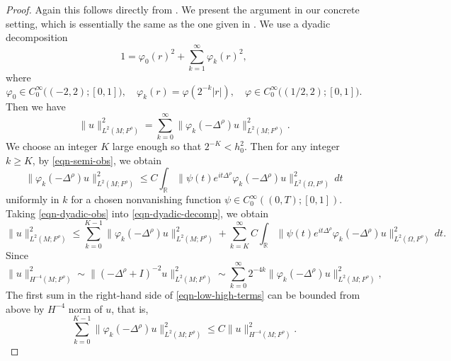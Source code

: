 \documentclass[11pt,oneside,reqno]{amsart}
\newcommand\R{\ensuremath{\mathbb{R}}}
\theoremstyle{definition}
\numberwithin{equation}{section}
\theoremstyle{plain}
\begin{document}
\begin{proof}
    Again this follows directly from  \cite[Theorem 7]{burq2004}. We present the argument in our concrete setting, which is essentially the same as the one given in \cite[Proposition 2.2]{jin2018control}. We use a dyadic decomposition  
    \begin{equation*}
        1=\varphi_0(r)^2+\sum_{k=1}^\infty \varphi_k(r)^2,
    \end{equation*}
    where 
    \begin{equation*}
        \varphi_0 \in C_0^\infty \bigl( (-2,2); [0,1] \bigr),\quad \varphi_k(r)=\varphi(2^{-k}|r|),\quad \varphi \in C_0^\infty \bigl((1/2,2);[0,1]\bigr).
    \end{equation*}
    Then we have
    \begin{equation}
        \|u\|^2_{L^2(M;F^\rho)}=\sum_{k=0}^\infty \|\varphi_k(-\Delta^\rho) u\|^2_{L^2(M;F^\rho)}.\label{eqn-dyadic-decomp}
    \end{equation}
    We choose an integer $K$ large enough so that $2^{-K}<h_0^2$. Then for any integer $k\ge K$, by \eqref{eqn-semi-obs}, we obtain
    \begin{equation}
        \|\varphi_k(-\Delta^\rho) u\|^2_{L^2(M;F^\rho)}\le C \int_\R \|\psi(t) e^{it\Delta^\rho}\varphi_k(-\Delta^\rho )u\|^2_{L^2(\Omega,F^\rho)}\,d t\label{eqn-dyadic-obs}
    \end{equation}
    uniformly in $k$ for a chosen nonvanishing function $\psi\in C_0^\infty ((0,T);[0,1])$. Taking \eqref{eqn-dyadic-obs} into \eqref{eqn-dyadic-decomp}, we obtain
    \begin{equation}
        \|u\|^2_{L^2(M;F^\rho)}\le \sum_{k=0}^{K-1} \|\varphi_k(-\Delta^\rho)u\|^2_{L^2(M;F^\rho)}+\sum_{k=K}^\infty C \int_\R \|\psi(t) e^{it\Delta^\rho}\varphi_k(-\Delta^\rho )u\|^2_{L^2(\Omega,F^\rho)}\,d t.\label{eqn-low-high-terms}
    \end{equation}
    Since
    \begin{equation*}
        \|u\|^2_{H^{-4}(M;F^\rho)}\sim \|(-\Delta^\rho+I)^{-2}u\|^2_{L^2(M;F^\rho)}\sim \sum_{k=0}^\infty 2^{-4k}\|\varphi_k(-\Delta^\rho) u\|^2_{L^2(M;F^\rho)},
    \end{equation*}
    The first sum in the right-hand side of \eqref{eqn-low-high-terms} can be bounded from above by $H^{-4}$ norm of $u$, that is,
    \begin{equation}
        \sum_{k=0}^{K-1} \|\varphi_k(-\Delta^\rho)u\|^2_{L^2(M;F^\rho)} \le C \|u\|^2_{H^{-4}(M;F^\rho)}.\label{eqn-low-estimate}
    \end{equation}

\end{proof}
\end{document}
